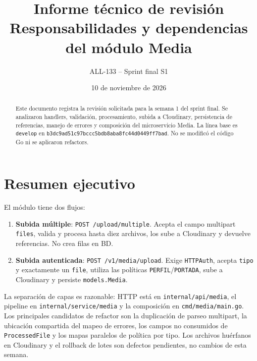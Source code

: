 \documentclass[11pt,a4paper]{article}
\title{Informe técnico de revisión\\Responsabilidades y dependencias del módulo Media}
\author{ALL-133 -- Sprint final S1}
\date{10 de noviembre de 2026}
\begin{document}
\maketitle

\begin{abstract}
Este documento registra la revisión solicitada para la semana 1 del sprint final. Se analizaron handlers, validación, procesamiento, subida a Cloudinary, persistencia de referencias, manejo de errores y composición del microservicio Media. La línea base es \nolinkurl{develop} en \nolinkurl{b3dc9ad51c97bccc5bdb8aba8fc44d0449ff7bad}. No se modificó el código Go ni se aplicaron refactors.
\end{abstract}

\section{Resumen ejecutivo}
El módulo tiene dos flujos:
\begin{enumerate}
\item \textbf{Subida múltiple}: \nolinkurl{POST /upload/multiple}. Acepta el campo multipart \nolinkurl{files}, valida y procesa hasta diez archivos, los sube a Cloudinary y devuelve referencias. No crea filas en BD.
\item \textbf{Subida autenticada}: \nolinkurl{POST /v1/media/upload}. Exige \nolinkurl{HTTPAuth}, acepta \nolinkurl{tipo} y exactamente un \nolinkurl{file}, utiliza las políticas \nolinkurl{PERFIL}/\nolinkurl{PORTADA}, sube a Cloudinary y persiste \nolinkurl{models.Media}.
\end{enumerate}

La separación de capas es razonable: HTTP está en \nolinkurl{internal/api/media}, el pipeline en \nolinkurl{internal/service/media} y la composición en \nolinkurl{cmd/media/main.go}. Los principales candidatos de refactor son la duplicación de parseo multipart, la ubicación compartida del mapeo de errores, los campos no consumidos de \nolinkurl{ProcessedFile} y los mapas paralelos de política por tipo. Los archivos huérfanos en Cloudinary y el rollback de lotes son defectos pendientes, no cambios de esta semana.
\end{document}
